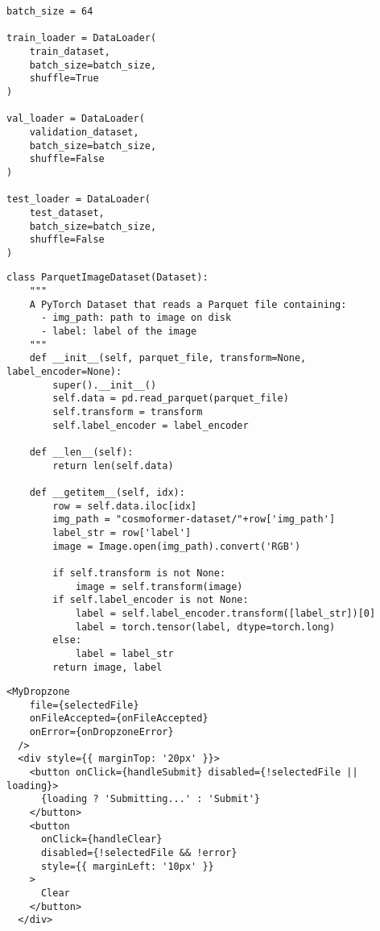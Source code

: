 \newpage

\begin{samepage}
\begin{lstlisting}[style=mypython, caption={DataLoader code example}, label={lst:data-DataLoader}]
batch_size = 64

train_loader = DataLoader(
    train_dataset,
    batch_size=batch_size,
    shuffle=True
)

val_loader = DataLoader(
    validation_dataset,
    batch_size=batch_size,
    shuffle=False
)

test_loader = DataLoader(
    test_dataset,
    batch_size=batch_size,
    shuffle=False
)
\end{lstlisting}
\end{samepage}

\begin{samepage}
\begin{lstlisting}[style=mypython, caption={Dataset subclass code example}, label={lst:data-Dataset}]
class ParquetImageDataset(Dataset):
    """
    A PyTorch Dataset that reads a Parquet file containing:
      - img_path: path to image on disk
      - label: label of the image
    """
    def __init__(self, parquet_file, transform=None, label_encoder=None):
        super().__init__()
        self.data = pd.read_parquet(parquet_file)
        self.transform = transform
        self.label_encoder = label_encoder

    def __len__(self):
        return len(self.data)

    def __getitem__(self, idx):
        row = self.data.iloc[idx]
        img_path = "cosmoformer-dataset/"+row['img_path']
        label_str = row['label']
        image = Image.open(img_path).convert('RGB')

        if self.transform is not None:
            image = self.transform(image)
        if self.label_encoder is not None:
            label = self.label_encoder.transform([label_str])[0]
            label = torch.tensor(label, dtype=torch.long)
        else:
            label = label_str
        return image, label
\end{lstlisting}
\end{samepage}

\begin{samepage}
\begin{lstlisting}[style=mypython, caption={React Dropzone code example}, label={lst:fe-dz}]
  <MyDropzone
    file={selectedFile}
    onFileAccepted={onFileAccepted}
    onError={onDropzoneError}
  />
  <div style={{ marginTop: '20px' }}>
    <button onClick={handleSubmit} disabled={!selectedFile || loading}>
      {loading ? 'Submitting...' : 'Submit'}
    </button>
    <button
      onClick={handleClear}
      disabled={!selectedFile && !error}
      style={{ marginLeft: '10px' }}
    >
      Clear
    </button>
  </div>
\end{lstlisting}
\end{samepage}

